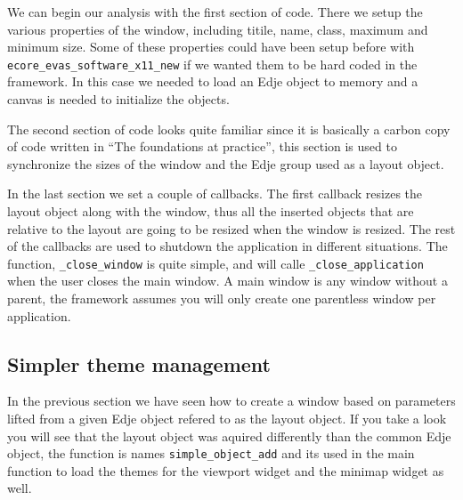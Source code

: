 \documentclass[12pt,a4paper,english]{book}
\begin{document}
We can begin our analysis with the first section of code. There we setup the
various properties of the window, including titile, name, class, maximum and
minimum size. Some of these properties could have been setup before
with \texttt{ecore{\_}evas{\_}software{\_}x11{\_}new} if we wanted them to be hard coded in the
framework. In this case we needed to load an Edje object to memory and a canvas
is needed to initialize the objects.

The second section of code looks quite familiar since it is basically a carbon
copy of code written in ``The foundations at practice'', this section is used to
synchronize the sizes of the window and the Edje group used as a layout object.

In the last section we set a couple of callbacks. The first callback resizes
the layout object along with the window, thus all the inserted objects that are
relative to the layout are going to be resized when the window is resized. The
rest of the callbacks are used to shutdown the application in different
situations. The function, \texttt{{\_}close{\_}window} is quite simple, and will calle
\texttt{{\_}close{\_}application} when the user closes the main window. A main window is
any window without a parent, the framework assumes you will only create one
parentless window per application.



\hypertarget{simpler-theme-management}{}
\subsection{Simpler theme management}
\label{simpler-theme-management}

In the previous section we have seen how to create a window based on parameters
lifted from a given Edje object refered to as the layout object. If you take
a look you will see that the layout object was aquired differently than the
common Edje object, the function is names \texttt{simple{\_}object{\_}add} and its used
in the main function to load the themes for the viewport widget and the minimap
widget as well.
\end{document}
